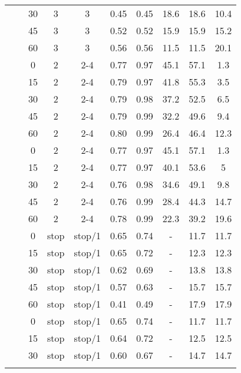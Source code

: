 \begin{longtable}[h!]{cccccccccc}
\nopagebreak
&  & 30 & 3 & 3 & 0.45 & 0.45 & 18.6 & 18.6 & 10.4\\
\nopagebreak
&  & 45 & 3 & 3 & 0.52 & 0.52 & 15.9 & 15.9 & 15.2\\
\nopagebreak
\multirow{-10}{*}{\centering\arraybackslash 9} & \multirow{-5}{*}{\centering\arraybackslash 0.33} & 60 & 3 & 3 & 0.56 & 0.56 & 11.5 & 11.5 & 20.1\\
\cmidrule{1-10}\pagebreak[0]
&  & 0 & 2 & 2-4 & 0.77 & 0.97 & 45.1 & 57.1 & 1.3\\
\nopagebreak
&  & 15 & 2 & 2-4 & 0.79 & 0.97 & 41.8 & 55.3 & 3.5\\
\nopagebreak
&  & 30 & 2 & 2-4 & 0.79 & 0.98 & 37.2 & 52.5 & 6.5\\
\nopagebreak
&  & 45 & 2 & 2-4 & 0.79 & 0.99 & 32.2 & 49.6 & 9.4\\
\nopagebreak
& \multirow{-5}{*}{\centering\arraybackslash 0.2} & 60 & 2 & 2-4 & 0.80 & 0.99 & 26.4 & 46.4 & 12.3\\
\nopagebreak
&  & 0 & 2 & 2-4 & 0.77 & 0.97 & 45.1 & 57.1 & 1.3\\
\nopagebreak
&  & 15 & 2 & 2-4 & 0.77 & 0.97 & 40.1 & 53.6 & 5\\
\nopagebreak
&  & 30 & 2 & 2-4 & 0.76 & 0.98 & 34.6 & 49.1 & 9.8\\
\nopagebreak
&  & 45 & 2 & 2-4 & 0.76 & 0.99 & 28.4 & 44.3 & 14.7\\
\nopagebreak
\multirow{-10}{*}{\centering\arraybackslash 10} & \multirow{-5}{*}{\centering\arraybackslash 0.33} & 60 & 2 & 2-4 & 0.78 & 0.99 & 22.3 & 39.2 & 19.6\\
\cmidrule{1-10}\pagebreak[0]
&  & 0 & stop & stop/1 & 0.65 & 0.74 & - & 11.7 & 11.7\\
\nopagebreak
&  & 15 & stop & stop/1 & 0.65 & 0.72 & - & 12.3 & 12.3\\
\nopagebreak
&  & 30 & stop & stop/1 & 0.62 & 0.69 & - & 13.8 & 13.8\\
\nopagebreak
&  & 45 & stop & stop/1 & 0.57 & 0.63 & - & 15.7 & 15.7\\
\nopagebreak
& \multirow{-5}{*}{\centering\arraybackslash 0.2} & 60 & stop & stop/1 & 0.41 & 0.49 & - & 17.9 & 17.9\\
\nopagebreak
&  & 0 & stop & stop/1 & 0.65 & 0.74 & - & 11.7 & 11.7\\
\nopagebreak
&  & 15 & stop & stop/1 & 0.64 & 0.72 & - & 12.5 & 12.5\\
\nopagebreak
&  & 30 & stop & stop/1 & 0.60 & 0.67 & - & 14.7 & 14.7\\
\nopagebreak

\end{longtable}
